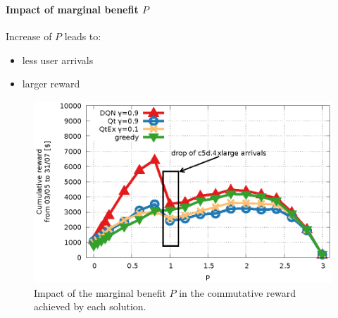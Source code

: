 \documentclass[aspectratio=169]{beamer}
\begin{document}
\begin{frame}
   \frametitle{\secname}
   \framesubtitle{Impact of marginal benefit $P$}

   \begin{minipage}{.25\textwidth}
       Increase of $P$ leads to:
       \begin{itemize}
           \item less user arrivals
           \item larger reward
       \end{itemize}
   \end{minipage}
   \hfill
   \begin{minipage}{.7\textwidth}
       \begin{figure}
           \centering
           \includegraphics[width=\textwidth]{img/margin-benefits.eps}
           \caption{Impact of the marginal benefit $P$ in the
           commutative reward achieved by each solution.}
           \label{fig:margin-benefits}
       \end{figure}
   \end{minipage}
\end{frame}
\end{document}
